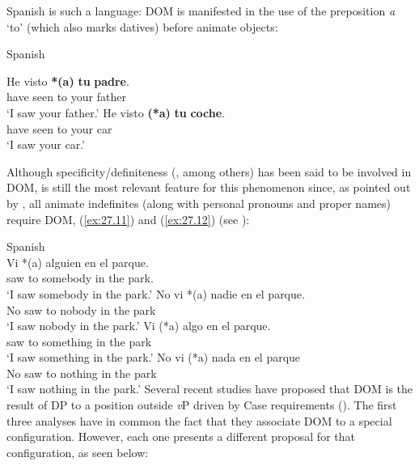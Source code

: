 \documentclass[output=paper]{langsci/langscibook}
\begin{document}
Spanish is such a language: DOM is manifested in the use of the preposition
\emph{a} `to' (which also marks datives) before animate objects:

\ea\label{ex:27.10} Spanish\\
    \begin{multicols}{2}\ea
        \gll He     visto \textbf{*(a)} \textbf{tu} \textbf{padre}.\\
        have  seen   \hphantom{\textbf{*(}}to   your   father\\
        \glt `I saw your father.'
    \ex
        \gll He     visto \textbf{(*a)} \textbf{tu} \textbf{coche}.\\
            have  seen     \hphantom{\textbf{*(}}to  your car\\
        \glt `I saw your car.'
    \z\end{multicols}
\z
Although specificity/definiteness (\citealt{Leonetti2004,Lopez2012}, among
others) has
been said to be involved in DOM, 
is still the most relevant feature for this phenomenon since, as pointed out by
\citet{Rodriguez-Mondonedo2007}, all animate indefinites (along with personal
pronouns and proper names) require DOM,
(\ref{ex:27.11}) and (\ref{ex:27.12}) (see
\citealt{Rodriguez-Mondonedo2007}):

\ea\label{ex:27.11} Spanish\\
    \ea
        \gll Vi *(a) alguien en el parque.\\
        saw \hphantom{*(}to somebody in the park.\\
        \glt `I saw somebody in the park.'
    \ex
        \gll No vi *(a) nadie en el parque.\\
            No saw \hphantom{*(}to nobody in the park\\
        \glt `I saw nobody in the park.'
    \z
\ex\label{ex:27.12} 
    \ea
        \gll Vi (*a) algo en el parque.\\
               saw \hphantom{*(}to something in the park\\
        \glt `I saw something in the park.'
    \ex
        \gll No vi (*a) nada en el parque\\
            No saw \hphantom{*(}to nothing in the park\\
        \glt `I saw nothing in the park.'
    \z
\z
Several recent studies have proposed that DOM
is the result of DP  to a position outside \emph{v}P driven by Case
requirements (\citealt{Torrego1998,
Rodriguez-Mondonedo2007,Lopez2012,OrmazabalRomero2013,Zdrojewski2013,OrdonezRoca2017}).
The first three analyses have in common the fact that they associate
\gls{DOM} to a special configuration. However, each
one presents a different proposal for that configuration, as seen
below:
\end{document}
